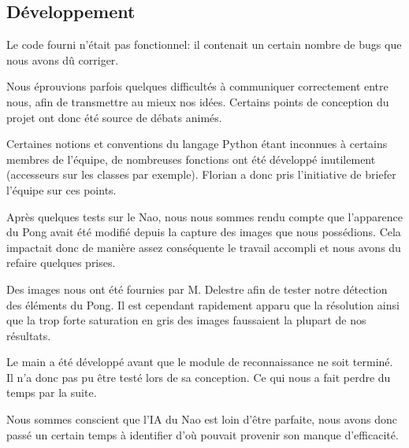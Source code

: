 \subsection{Développement}
\par Le code fourni n'était pas fonctionnel: il contenait un certain nombre de bugs que nous avons dû corriger.
\par Nous éprouvions parfois quelques difficultés à communiquer correctement entre nous, afin de transmettre au mieux nos idées. Certains points de conception du projet ont donc été source de débats animés.
\par Certaines notions et conventions du langage Python étant inconnues à certains membres de l'équipe, de nombreuses fonctions ont été développé inutilement (accesseurs sur les classes par exemple). Florian a donc pris l’initiative de briefer l’équipe sur ces points.
\par Après quelques tests sur le Nao, nous nous sommes rendu compte que l’apparence du Pong avait été modifié depuis la capture des images que nous possédions. Cela impactait donc de manière assez conséquente le travail accompli et nous avons du refaire quelques prises.
\par Des images nous ont été fournies par M. Delestre afin de tester notre détection des éléments du Pong. Il est cependant rapidement apparu que la résolution ainsi que la trop forte saturation en gris des images faussaient la plupart de nos résultats.
\par Le main a été développé avant que le module de reconnaissance ne soit terminé. Il n’a donc pas pu être testé lors de sa conception. Ce qui nous a fait perdre du temps par la suite.
\par Nous sommes conscient que l'IA du Nao est loin d'être parfaite, nous avons donc passé un certain temps à identifier d'où pouvait provenir son manque d'efficacité.

\pagebreak
